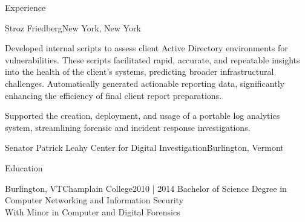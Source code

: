 \documentclass[]{mcdowellcv}
\begin{document}
\begin{cvsection}{Experience}
\begin{jobentry}{Stroz Friedberg}{New York, New York}
        \begin{jobprojects}
            \item Developed internal scripts to assess client Active Directory environments for vulnerabilities. These scripts facilitated rapid, accurate, and repeatable insights into the health of the client's systems, predicting broader infrastructural challenges. Automatically generated actionable reporting data, significantly enhancing the efficiency of final client report preparations.
            \item Supported the creation, deployment, and usage of a portable log analytics system, streamlining forensic and incident response investigations.
        \end{jobprojects}
    \end{jobentry}

    \begin{jobentry}{Senator Patrick Leahy Center for Digital Investigation}{Burlington, Vermont}
        \begin{jobpositions}
        \end{jobpositions}
        
    \end{jobentry}

\end{cvsection}

\begin{cvsection}{Education}
    \begin{cvsubsection}{Burlington, VT}{Champlain College}{2010 | 2014}
        \vspace{-1em}Bachelor of Science Degree in Computer Networking and Information Security\\
        \hspace*{1em}With Minor in Computer and Digital Forensics
    \end{cvsubsection}
\end{cvsection}
\end{document}
